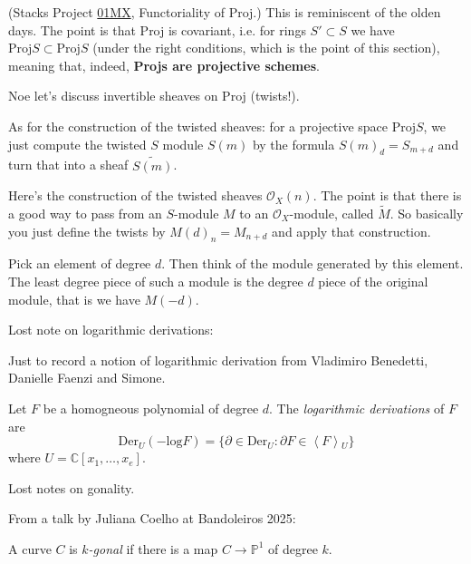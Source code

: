 \documentclass{book}
\begin{document}
(Stacks Project
\href{https://stacks.math.columbia.edu/tag/%
01MX}{01MX},
Functoriality of Proj.)
This is reminiscent of the olden days.
The point is that Proj is covariant,
i.e. for rings  $S' \subset S$ we have
$\text{Proj}S \subset \text{Proj}S$
(under the right conditions,
which is the point of this section),
meaning that, indeed,
{\bf Projs are projective schemes}.






\medskip\noindent
Noe let's discuss invertible sheaves on Proj
(twists!).

\noindent
As for the construction of the twisted
sheaves:
for a projective space $\text{Proj} S$,
we just compute the twisted $S$ module
$S(m)$ by the formula $S(m)_d=S_{m+d}$
and turn that into a sheaf
$\widetilde{S(m)}$.

Here's the construction of the twisted
sheaves $\mathcal{O}_X(n)$.
The point is that there is a good way
to pass from an $S$-module $M$ to an
$\mathcal{O}_X$-module, called
$\widetilde{M}$.
So basically you just define the twists
by $M(d)_n=M_{n+d}$ and apply that
construction.

Pick an element of degree $d$.
Then think of the module generated by this
element.
The least degree piece of such a module
is the degree $d$ piece of the original
module,
that is we have $M(-d)$.











\medskip\noindent
Lost note on logarithmic derivations:

\noindent
Just to record a notion of logarithmic
derivation
from Vladimiro Benedetti, Danielle Faenzi and
Simone.

Let $F$ be a homogneous polynomial of degree
$d$.
The {\it logarithmic derivations} of $F$ are
$$
\text{Der}_U(-\text{log}F)
=\{\partial \in \text{Der}_U
:\partial F \in \left\langle{}F\right\rangle{}_U\}
$$
where $U=\mathbb{C}[x_1,…,x_e]$.










\medskip\noindent
Lost notes on gonality.

\noindent
From a talk by Juliana Coelho at Bandoleiros
2025:

A curve $C$ is {\it $k$-gonal} if there is a
map $C \to \mathbb{P}^1$ of degree $k$.
\end{document}
